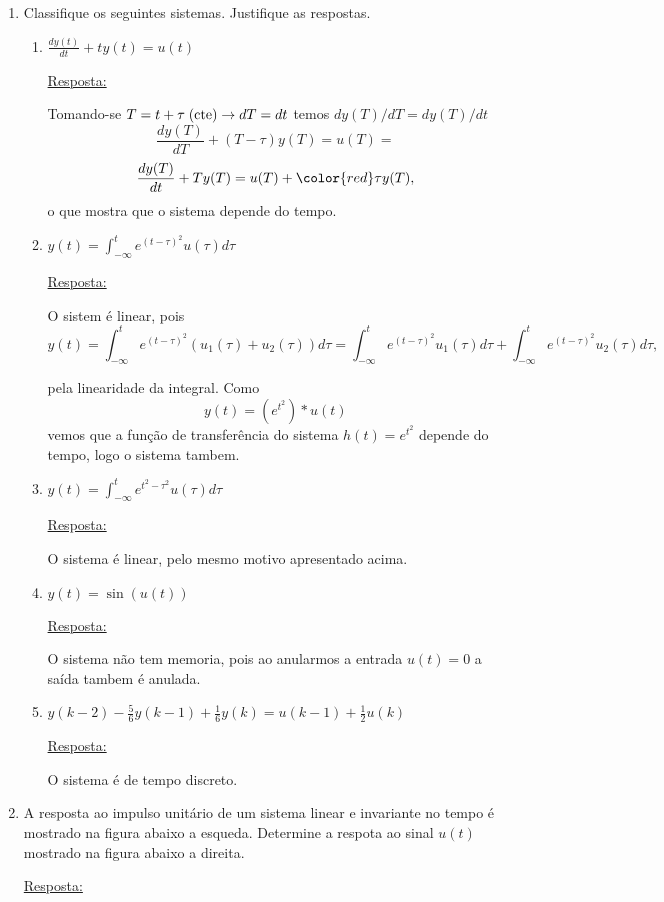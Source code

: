 \documentclass[a4paper, 12pt]{article}
\begin{document}
\begin{enumerate}
\item Classifique os seguintes sistemas. Justifique as respostas.
\begin{enumerate}
\item $\frac{dy(t)}{dt} + ty(t) = u(t)$

\underline{Resposta:}

 Tomando-se $T=t+\tau\; ({\rm cte}) \rightarrow dT=dt$ temos $dy(T)/dT = dy(T)/dt$
 \[\frac{dy(T)}{dT}+(T-\tau)y(T) = u(T) =\]
 \[\frac{dy(T)}{dt}+Ty(T) = u(T) + {\color{red} \tau y(T)},\]
 o que mostra que o sistema depende do tempo.

\item $y(t) = \int_{-\infty}^{t} e^{(t-\tau)^2}u(\tau)d\tau$

\underline{Resposta:}

 O sistem é linear, pois 
 \[y(t) = \int_{-\infty}^{t} e^{(t-\tau)^2}(u_1(\tau)+u_2(\tau))d\tau = \int_{-\infty}^{t}
e^{(t-\tau)^2}u_1(\tau)d\tau + \int_{-\infty}^{t} e^{(t-\tau)^2}u_2(\tau)d\tau,\]

 pela linearidade da integral. Como
 \[y(t) = (e^{t^2})\ast u(t)\]
 vemos que a função de transferência do sistema $h(t) = e^{t^2}$ depende do tempo, logo o sistema
tambem.

\item $y(t) = \int_{-\infty}^{t} e^{t^2-\tau^2}u(\tau)d\tau$

\underline{Resposta:}

 O sistema é linear, pelo mesmo motivo apresentado acima. 

\item $y(t) = \sin(u(t))$

\underline{Resposta:}

 O sistema não tem memoria, pois ao anularmos a entrada $u(t) = 0$ a saída tambem é anulada.

\item $y(k-2) -\frac{5}{6}y(k-1)+\frac{1}{6}y(k) = u(k-1)+\frac{1}{2}u(k)$

\underline{Resposta:}

 O sistema é de tempo discreto. 

\end{enumerate}
\item A resposta ao impulso unitário de um sistema linear e invariante no tempo é mostrado na figura
abaixo a esqueda. Determine a respota ao sinal $u(t)$ mostrado na figura abaixo a direita.

\underline{Resposta:}


\end{enumerate}
\end{document}
